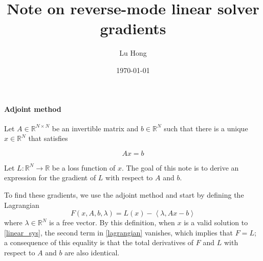\documentclass[11pt, a4paper]{article}
\title{Note on reverse-mode linear solver gradients}
\author{Lu Hong}
\date{\today}
\begin{document}
\maketitle

\paragraph{Adjoint method}
Let $A\in\mathbb R^{N\times N}$ be an invertible matrix and $b\in\mathbb R^{N}$ such that there is a unique $x\in\mathbb R^N$ that satisfies

\begin{equation}
    Ax=b \label{linear_sys}
\end{equation}

Let $L:\mathbb R^N\to \mathbb R$ be a loss function of $x$. The goal of this note is to derive an expression for the gradient of $L$ with respect to $A$ and $b$.

To find these gradients, we use the adjoint method and start by defining the Lagrangian
\begin{equation}
    F(x, A, b, \lambda) = L(x) - \left<\lambda, Ax-b\right> \label{lagrangian}
\end{equation}
where $\lambda\in\mathbb R^N$ is a free vector. By this definition, when $x$ is a valid solution to \eqref{linear_sys}, the second term in \eqref{lagrangian} vanishes, which implies that $F=L$; a consequence of this equality is that the total derivatives of $F$ and $L$ with respect to $A$ and $b$ are also identical.
\end{document}
